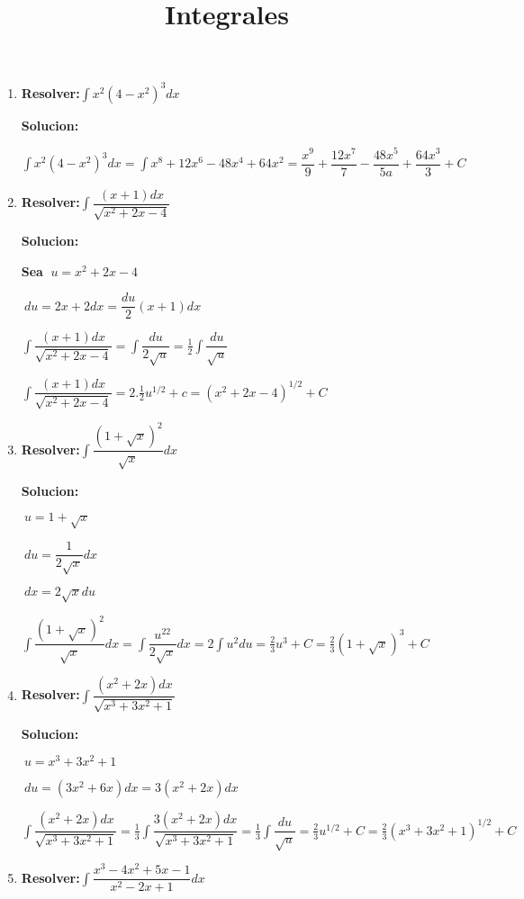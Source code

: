 \documentclass[10pt,a4paper]{book}
\title{Integrales}
\newcommand{\ds}{\displaystyle}
\begin{document}
\begin{enumerate} 
    \item \textbf{Resolver:}$\ds\int x^2(4-x^2)^3 dx$

        \textbf{Solucion:}

        $\ds\int x^2(4-x^2)^3 dx =\int x^8+12x^6-48x^4+64x^2=\dfrac{x^9}{9}+\dfrac{12x^7}{7}
        -\dfrac{48x^5}{5a}+\dfrac{64x^3}{3}+C$
    \vspace{0.5cm}
    \item \textbf{Resolver:}$\ds\int\dfrac{(x+1)dx}{\sqrt{x^2+2x-4} }$
     
        \textbf{Solucion:}

        \textbf{Sea $\ds\ u=x^2+2x-4$ } 

        $\ds\ du=2x+2dx=\dfrac{du}{2}(x+1)dx$

        $\ds\int\dfrac{(x+1)dx}{\sqrt{x^2+2x-4}}=\int\dfrac{du}{2\sqrt{u}}=\frac{1}{2}\int\dfrac{du}{\sqrt{u}}$

        $\ds\int\dfrac{(x+1)dx}{\sqrt{x^2+2x-4} }=2.\frac{1}{2}u^{1/2}+c=(x^2+2x-4)^{1/2}+C$
    \vspace{0.5cm}
    \item \textbf{Resolver:}$\ds\int\dfrac{(1+\sqrt{x})^2 }{\sqrt{x} }dx$
    
        \textbf{Solucion:}

        $\ds\ u=1+\sqrt{x}$
        
        $\ds\ du=\dfrac{1}{2\sqrt{x}}dx $

        $\ds\ dx=2\sqrt{x}du$
        
        $\ds\int\dfrac{(1+\sqrt{x})^2}{\sqrt{x}}dx=\int\dfrac{u^22}{2\sqrt{x}}dx=2\int u^2du=\frac{2}{3}u^3+C=\frac{2}{3}(1+\sqrt{x})^3+C$

    \vspace{0.5cm}
    \item \textbf{Resolver:}$\ds\int\dfrac{(x^2+2x)dx}{\sqrt{x^3+3x^2+1} }$
    
        \textbf{Solucion:}

        $\ds\ u=x^3+3x^2+1$

        $\ds\ du=(3x^2+6x)dx=3(x^2+2x)dx$

        $\ds\int\dfrac{(x^2+2x)dx}{\sqrt{x^3+3x^2+1}}=\frac{1}{3}\int\dfrac{3(x^2+2x)dx}{\sqrt{x^3+3x^2+1}}=\frac{1}{3}\int\dfrac{du}{\sqrt{u}}=\frac{2}{3}u^{1/2}+C=
        \frac{2}{3}(x^3+3x^2+1)^{1/2}+C$
        
    \vspace{0.5cm}
    \item \textbf{Resolver:}$\ds\int\dfrac{x^3-4x^2+5x-1}{x^2-2x+1}dx$
    

\end{enumerate}
\end{document}
